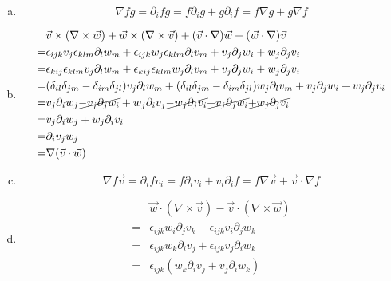 \documentclass[a4paper,german,12pt,smallheadings]{scrartcl}
\begin{document}
\begin{enumerate}[a)]
  \item
    \begin{equation}
      \nabla fg = \partial_i f g = f \partial_i g + g \partial_i f = f \nabla g + g \nabla f
    \end{equation}
  \item
    \begin{align}
      &\vec{v} \times (\nabla \times \vec{w}) + \vec{w} \times (\nabla \times \vec{v}) + (\vec{v} \cdot \nabla) \vec{w} + (\vec{w} \cdot \nabla) \vec{v} \\
      = &\epsilon_{ijk} v_j \epsilon_{klm} \partial_l w_m + \epsilon_{ijk} w_j \epsilon_{klm} \partial_l v_m + v_j \partial_j w_i + w_j \partial_j v_i\\
      = &\epsilon_{kij} \epsilon_{klm} v_j \partial_l w_m + \epsilon_{kij} \epsilon_{klm} w_j \partial_l v_m + v_j \partial_j w_i + w_j \partial_j v_i\\
      = &(\delta_{il} \delta_{jm} - \delta_{im} \delta_{jl}) v_j \partial_l w_m + (\delta_{il} \delta_{jm} - \delta_{im}\delta_{jl}) w_j \partial_l v_m + v_j \partial_j w_i + w_j \partial_j v_i\\
      = &v_j \partial_i w_j \cancel{- v_j \partial_j w_i} + w_j \partial_i v_j \cancel{- w_j \partial_j v_i} \cancel{+ v_j \partial_j w_i} \cancel{+ w_j \partial_j v_i}\\
      = &v_j \partial_i w_j + w_j \partial_i v_i\\
      = &\partial_i v_j w_j\\
      = &\nabla(\vec{v} \cdot \vec{w})
    \end{align}
  \item
    \begin{equation}
      \nabla f \vec{v}
      = \partial_i f v_i
      = f \partial_i v_i + v_i \partial_i f
      = f \nabla \vec{v} + \vec{v} \cdot \nabla f
    \end{equation}
  \item
    \begin{align}
      &\vec{w} \cdot (\nabla \times \vec{v}) - \vec{v} \cdot (\nabla \times \vec{w}) \\
      =  &\epsilon_{ijk} w_i \partial_j v_k - \epsilon_{ijk} v_i \partial_j w_k \\
      =  &\epsilon_{ijk} w_k \partial_i v_j + \epsilon_{ijk} v_j \partial_i w_k \\
      =  &\epsilon_{ijk} (w_k \partial_i v_j + v_j \partial_i w_k) \\

\end{align}
\end{enumerate}
\end{document}

